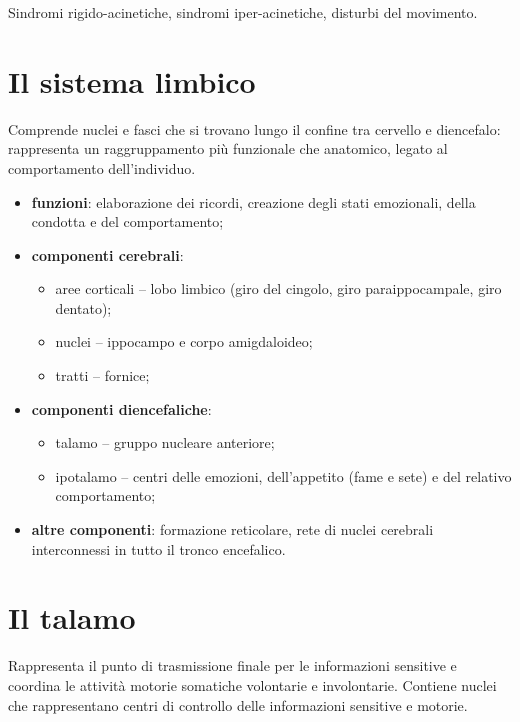 Sindromi rigido-acinetiche, sindromi iper-acinetiche, disturbi del movimento.

\section{Il sistema limbico}

Comprende nuclei e fasci che si trovano lungo il confine tra cervello e
diencefalo: rappresenta un raggruppamento più funzionale che anatomico, legato
al comportamento dell'individuo.

\begin{itemize}
  \item \textbf{funzioni}: elaborazione dei ricordi, creazione degli stati
    emozionali, della condotta e del comportamento;
  \item \textbf{componenti cerebrali}:
    \begin{itemize}
      \item aree corticali -- lobo limbico (giro del cingolo, giro
        paraippocampale, giro dentato);
      \item nuclei -- ippocampo e corpo amigdaloideo;
      \item tratti -- fornice;
    \end{itemize}
  \item \textbf{componenti diencefaliche}:
    \begin{itemize}
      \item talamo -- gruppo nucleare anteriore;
      \item ipotalamo -- centri delle emozioni, dell'appetito (fame e sete) e
        del relativo comportamento;
    \end{itemize}
  \item \textbf{altre componenti}: formazione reticolare, rete di nuclei
    cerebrali interconnessi in tutto il tronco encefalico.
\end{itemize}

\section{Il talamo}

Rappresenta il punto di trasmissione finale per le informazioni sensitive e
coordina le attività motorie somatiche volontarie e involontarie. Contiene
nuclei che rappresentano centri di controllo delle informazioni sensitive e
motorie.


